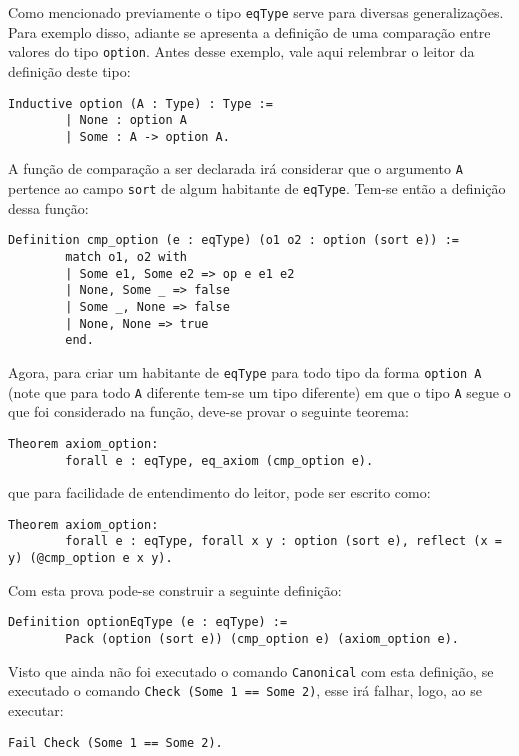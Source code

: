 Como mencionado previamente o tipo \lstinline[language = coq]$eqType$ serve para diversas generalizações. Para exemplo disso, adiante se apresenta a definição de uma comparação entre valores do tipo \lstinline[language = coq]$option$. Antes desse exemplo, vale aqui relembrar o leitor da definição deste tipo:
\begin{lstlisting}[language = coq]
    Inductive option (A : Type) : Type :=
        | None : option A
        | Some : A -> option A.
\end{lstlisting}
A função de comparação a ser declarada irá considerar que o argumento \lstinline[language = coq]$A$ pertence ao campo \lstinline[language = coq]$sort$ de algum habitante de \lstinline[language = coq]$eqType$. Tem-se então a definição dessa função:
\begin{lstlisting}[language = coq]
    Definition cmp_option (e : eqType) (o1 o2 : option (sort e)) :=
        match o1, o2 with
        | Some e1, Some e2 => op e e1 e2
        | None, Some _ => false
        | Some _, None => false
        | None, None => true
        end.
\end{lstlisting}
Agora, para criar um habitante de \lstinline[language = coq]$eqType$ para todo tipo da forma \lstinline[language = coq]$option A$ (note que para todo \lstinline[language = coq]$A$ diferente tem-se um tipo diferente) em que o tipo \lstinline[language = coq]$A$ segue o que foi considerado na função, deve-se provar o seguinte teorema:
\begin{lstlisting}[language = coq]
    Theorem axiom_option: 
        forall e : eqType, eq_axiom (cmp_option e).
\end{lstlisting}
que para facilidade de entendimento do leitor, pode ser escrito como:
\begin{lstlisting}[language = coq]
    Theorem axiom_option: 
        forall e : eqType, forall x y : option (sort e), reflect (x = y) (@cmp_option e x y).
\end{lstlisting}
Com esta prova pode-se construir a seguinte definição:
\begin{lstlisting}[language = coq]
    Definition optionEqType (e : eqType) := 
        Pack (option (sort e)) (cmp_option e) (axiom_option e).
\end{lstlisting}
Visto que ainda não foi executado o comando \lstinline[language = coq]$Canonical$ com esta definição, se executado o comando \lstinline[language = coq]$Check (Some 1 == Some 2)$, esse irá falhar, logo, ao se executar:
\begin{lstlisting}[language = coq]
    Fail Check (Some 1 == Some 2).
\end{lstlisting}
